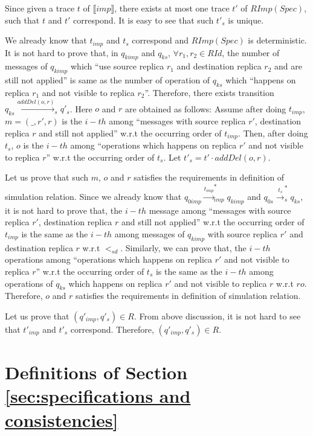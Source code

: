 {\begin{itemize}
Since given a trace $t$ of $\llbracket imp \rrbracket$, there exists at most one trace $t'$ of $RImp(Spec)$, such that $t$ and $t'$ correspond. It is easy to see that such $t'_s$ is unique.

We already know that $t_{imp}$ and $t_s$ correspond and $RImp(Spec)$ is deterministic. It is not hard to prove that, in $q_{kimp}$ and $q_{ks}$, $\forall r_1,r_2 \in RId$, the number of messages of $q_{kimp}$ which ``use source replica $r_1$ and destination replica $r_2$ and are still not applied'' is same as the number of operation of $q_{ks}$ which ``happens on replica $r_1$ and not visible to replica $r_2$''. Therefore, there exists transition $q_{ks} {\xrightarrow{addDel(o,r)}}_s q'_s$. Here $o$ and $r$ are obtained as follows: Assume after doing $t_{imp}$, $m=(\_,r',r)$ is the $i-th$ among ``messages with source replica $r'$, destination replica $r$ and still not applied'' w.r.t the occurring order of $t_{imp}$. Then, after doing $t_s$, $o$ is the $i-th$ among ``operations which happens on replica $r'$ and not visible to replica $r$'' w.r.t the occurring order of $t_s$. Let $t'_s = t' \cdot addDel(o,r)$.

Let us prove that such $m$, $o$ and $r$ satisfies the requirements in definition of simulation relation. Since we already know that $q_{0imp} {\xrightarrow{t_{imp}}}_{imp}^* q_{kimp}$ and $q_{0s} {\xrightarrow{t_s}}_s^* q_{ks}$, it is not hard to prove that, the $i-th$ message among ``messages with source replica $r'$, destination replica $r$ and still not applied'' w.r.t the occurring order of $t_{imp}$ is the same as the $i-th$ among messages of $q_{kimp}$ with source replica $r'$ and destination replica $r$ w.r.t $<_{sd}$. Similarly, we can prove that, the $i-th$ operations among ``operations which happens on replica $r'$ and not visible to replica $r$'' w.r.t the occurring order of $t_s$ is the same as the $i-th$ among operations of $q_{ks}$ which happens on replica $r'$ and not visible to replica $r$ w.r.t $ro$. Therefore, $o$ and $r$ satisfies the requirements in definition of simulation relation.

Let us prove that $(q'_{imp},q'_s) \in R$. From above discussion, it is not hard to see that $t'_{imp}$ and $t'_s$ correspond. Therefore, $(q'_{imp},q'_s) \in R$.
\end{itemize}
}








\section{Definitions of Section \ref{sec:specifications and consistencies}}
\label{sec:appendix definitions of section specifications and consistencies}

